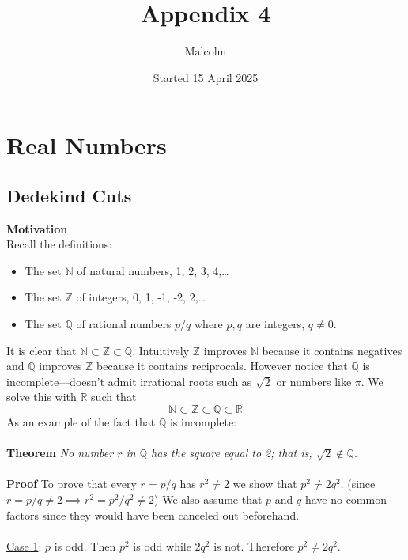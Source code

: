 \documentclass{report}
\title{Appendix 4}
\date{Started 15 April 2025}
\author{Malcolm}
\begin{document}
\maketitle

\tableofcontents

\newpage
\section{Real Numbers}
\subsection{Dedekind Cuts}
\textbf{Motivation}\\
Recall the definitions:
\begin{itemize}
\item The set $\mathbb{N}$ of natural numbers, 1, 2, 3, 4,\ldots
\item The set $\mathbb{Z}$ of integers, 0, 1, -1, -2, 2,\ldots 
\item The set $\mathbb{Q}$ of rational numbers $p/q$ where $p,q$ are integers, $q\neq0$.
\end{itemize}
It is clear that $\mathbb{N}\subset\mathbb{Z}\subset\mathbb{Q}$. Intuitively $\mathbb{Z}$ improves $\mathbb{N}$ 
because it contains negatives and $\mathbb{Q}$ improves $\mathbb{Z}$ because it contains reciprocals. However
notice that $\mathbb{Q}$ is incomplete---doesn't admit irrational roots such as $\sqrt{2}$ or numbers like $\pi$. 
We solve this with $\mathbb{R}$ such that
\begin{equation*}
\mathbb{N}\subset\mathbb{Z}\subset\mathbb{Q}\subset\mathbb{R}
\end{equation*}
As an example of the fact that $\mathbb{Q}$ is incomplete:\\
\vspace{1mm}\\
\textbf{Theorem} \textit{No number $r$ in $\mathbb{Q}$ has the square equal to 2; that is, 
$\sqrt{2}\notin\mathbb{Q}$.}\\
\vspace{1mm}\\
\textbf{Proof} To prove that every $r=p/q$ has $r^2\neq2$ we show that $p^2\neq2q^2$. (since $r=p/q\neq2\implies
r^2=p^2/q^2\neq2$) We also assume that $p$ and $q$ have no common factors since they would
have been canceled out beforehand.\\
\vspace{1mm}\\
\underline{Case 1}: $p$ is odd. Then $p^2$ is odd while $2q^2$ is not. Therefore $p^2\neq2q^2$.\\
\end{document}
